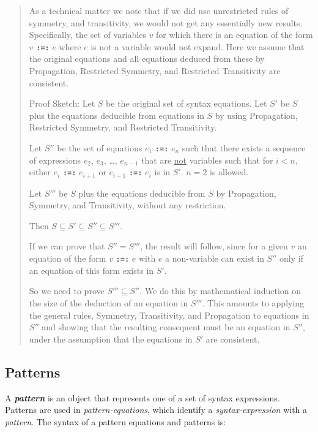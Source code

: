 \documentclass[12pt]{article}
\makeatletter
\newcommand{\TT}[1]{{\tt \bfseries #1}}
\newcommand{\emkey}[1]{{\bf \em #1}\index{#1@{\em #1}}}
\makeatother
\begin{document}
\begin{quote}

As a technical matter we note that if we did use unrestricted rules
of symmetry, and transitivity, we would not get any essentially new results.
Specifically, the set of variables $v$ for which there is an equation of the
form $v$ \TT{:=:} $e$ where $e$ is not a variable would not expand.  Here
we assume that the original equations and all equations deduced from
these by Propagation, Restricted Symmetry, and Restricted Transitivity are
consistent.

Proof Sketch: Let $S$ be the original set of syntax equations.  Let $S'$ be
$S$ plus the equations deducible from equations in $S$ by using Propagation,
Restricted Symmetry, and Restricted Transitivity.

Let $S''$ be the set of equations $e_1$ \TT{:=:} $e_n$
such that there exists a sequence of expressions $e_2$, $e_3$,
\ldots, $e_{n-1}$ that are \underline{not} variables such that for $i<n$,
either $e_i$ \TT{:=:} $e_{i+1}$
or $e_{i+1}$ \TT{:=:} $e_i$ is in $S'$.  $n=2$ is allowed.

Let $S'''$ be $S$ plus
the equations deducible from $S$ by Propagation, Symmetry,
and Transitivity, without any restriction.

Then $S\subseteq S'\subseteq S''\subseteq S'''$.

If we can prove that
$S''=S'''$, the result will follow, since for a given $v$ an equation
of the form $v$ \TT{:=:} $e$ with $e$ a non-variable can exist in $S''$ only
if an equation of this form exists in $S'$.

So we need to prove $S'''\subseteq S''$.  We do this by mathematical
induction on the size of the deduction of an equation in $S'''$.
This amounts to applying the general rules, Symmetry, Transitivity,
and Propagation to equations in $S''$ and showing that the resulting
consequent must be an equation in $S''$, under the assumption that the
equations in $S'$ are consistent.

\end{quote}

\subsection{Patterns}
\label{PATTERNS}
\label{PATTERN-EQUATIONS}

A \emkey{pattern} is an object that represents one of
a set of syntax expressions.  Patterns are used in
{\em pattern-equations}, which identify a {\em syntax-expression} with
a {\em pattern}.  The syntax of a pattern equations and patterns is:
\end{document}
